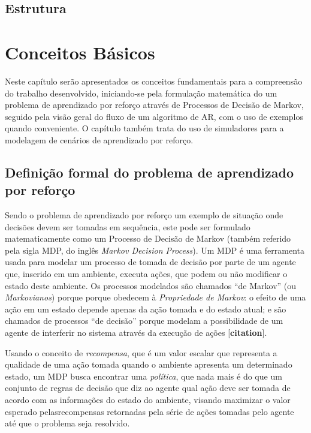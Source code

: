 \documentclass[cic,tc]{iiufrgs}
\begin{document}
\section{Estrutura}
\blindtext


\chapter{Conceitos Básicos}
Neste capítulo serão apresentados os conceitos fundamentais para a compreensão
do trabalho desenvolvido, iniciando-se pela formulação matemática do um problema
de aprendizado por reforço através de Processos de Decisão de Markov, seguido
pela visão geral do fluxo de um algoritmo de AR, com o uso de exemplos quando
conveniente. O capítulo também trata do uso de simuladores para a modelagem de
cenários de aprendizado por reforço.

\section{Definição formal do problema de aprendizado por reforço}
Sendo o problema de aprendizado por reforço um exemplo de situação onde decisões
devem ser tomadas em sequência, este pode ser formulado matematicamente como um
Processo de Decisão de Markov (também referido pela sigla MDP, do inglês
\textit{Markov Decision Process}). Um MDP é uma ferramenta usada para modelar
um processo de tomada de decisão por parte de um agente que, inserido em um
ambiente, executa ações, que podem ou não modificar o estado deste ambiente.
Os processos modelados são chamados ``de Markov'' (ou \textit{Markovianos}) porque
porque obedecem à \textit{Propriedade de Markov}: o efeito de uma ação em um
estado depende apenas da ação tomada e do estado atual; e são chamados de
processos ``de decisão''  porque modelam a possibilidade de um agente de
interferir no sistema através da execução de ações [\textbf{citation}].


Usando o conceito de \textit{recompensa}, que é um valor escalar que representa a
qualidade de uma ação tomada quando o ambiente apresenta um determinado estado,
um MDP busca encontrar uma \textit{política}, que nada mais é do que um
conjunto de regras de decisão que diz ao agente qual ação deve ser tomada de
acordo com as informações do estado do ambiente, visando maximizar o valor
esperado pelasrecompensas retornadas pela série de ações tomadas pelo agente até
que o problema seja resolvido.
\end{document}
